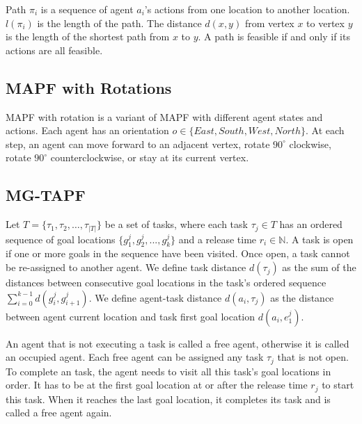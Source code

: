 \documentclass[letterpaper]{article} %
\begin{document}
Path $ \pi_i $ is a sequence of agent $a_i$'s actions from one location to another location. 
$l(\pi_i)$ is the length of the path. 
The distance $d(x, y)$ from vertex $x$ to vertex $y$ is the length of the shortest path from $x$ to $y$.
A path is feasible if and only if its actions are all feasible. 

\subsection{MAPF with Rotations}
MAPF with rotation is a variant of MAPF with different agent states and actions. 
Each agent has an orientation $o \in \{East, South, West, North\}$.
At each step, an agent can move forward to an adjacent vertex, rotate $90^\circ$ clockwise, rotate $90^\circ$ counterclockwise, or stay at its current vertex.

\subsection{MG-TAPF}
Let $ T = \{ \tau_1, \tau_2, \dots, \tau_{|T|} \}$ be a set of tasks, where each task $\tau_j \in T$ has an ordered sequence of goal locations $\{g_1^j, g_2^j, ..., g_k^j\}$ and a release time $ r_i \in \mathbb{N} $. 
A task is open if one or more goals in the sequence have been visited. 
Once open, a task cannot be re-assigned to another agent. 
We define task distance $d(\tau_j)$ as the sum of the distances between consecutive goal locations in the task's ordered sequence $\sum_{i=0}^{k-1}d(g_i^j, g_{i+1}^j)$. 
We define agent-task distance $d(a_i, \tau_j)$ as the distance between agent current location and task first goal location $d(a_i, e^j_1)$. 

An agent that is not executing a task is called a free agent, otherwise it is called an occupied agent. 
Each free agent can be assigned any task $ \tau_j $ that is not open.
To complete an task, the agent needs to visit all this task's goal locations in order. 
It has to be at the first goal location at or after the release time $r_j$ to start this task.
When it reaches the last goal location, it completes its task and is called a free agent again.
\end{document}
